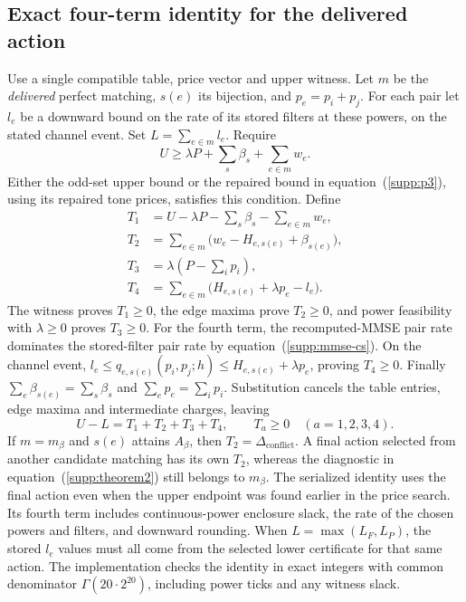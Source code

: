 \documentclass[10pt,letterpaper]{article}
\begin{document}
\subsection{Exact four-term identity for the delivered action}
Use a single compatible table, price vector and upper witness. Let $m$ be the \emph{delivered} perfect matching, $s(e)$ its bijection, and $p_e=p_i+p_j$. For each pair let $l_e$ be a downward bound on the rate of its stored filters at these powers, on the stated channel event. Set $L=\sum_{e\in m}l_e$. Require
\begin{equation}
 U\ge\lambda P+\sum_s\beta_s+\sum_{e\in m}w_e.
 \label{supp:decomposition-witness}
\end{equation}
Either the odd-set upper bound or the repaired bound in equation~(\ref{supp:p3}), using its repaired tone prices, satisfies this condition. Define
\begin{equation}
 \begin{aligned}
 T_1&=U-\lambda P-\sum_s\beta_s-\sum_{e\in m}w_e,\\
 T_2&=\sum_{e\in m}\bigl(w_e-H_{e,s(e)}+\beta_{s(e)}\bigr),\\
 T_3&=\lambda\left(P-\sum_i p_i\right),\\
 T_4&=\sum_{e\in m}\bigl(H_{e,s(e)}+\lambda p_e-l_e\bigr).
 \end{aligned}
 \label{supp:four_terms}
\end{equation}
The witness proves $T_1\ge0$, the edge maxima prove $T_2\ge0$, and power feasibility with $\lambda\ge0$ proves $T_3\ge0$. For the fourth term, the recomputed-MMSE pair rate dominates the stored-filter pair rate by equation~(\ref{supp:mmse-cs}). On the channel event,
$l_e\le q_{e,s(e)}(p_i,p_j;h)\le H_{e,s(e)}+\lambda p_e$, proving $T_4\ge0$. Finally $\sum_e\beta_{s(e)}=\sum_s\beta_s$ and $\sum_e p_e=\sum_i p_i$. Substitution cancels the table entries, edge maxima and intermediate charges, leaving
\begin{equation}
 U-L=T_1+T_2+T_3+T_4,\qquad T_a\ge0\quad(a=1,2,3,4).
 \label{supp:decomposition-identity}
\end{equation}
If $m=m_\beta$ and $s(e)$ attains $A_\beta$, then $T_2=\Delta_{\mathrm{conflict}}$. A final action selected from another candidate matching has its own $T_2$, whereas the diagnostic in equation~(\ref{supp:theorem2}) still belongs to $m_\beta$. The serialized identity uses the final action even when the upper endpoint was found earlier in the price search. Its fourth term includes continuous-power enclosure slack, the rate of the chosen powers and filters, and downward rounding. When $L=\max(L_F,L_P)$, the stored $l_e$ values must all come from the selected lower certificate for that same action. The implementation checks the identity in exact integers with common denominator $\Gamma(20\cdot2^{20})$, including power ticks and any witness slack.
\end{document}
